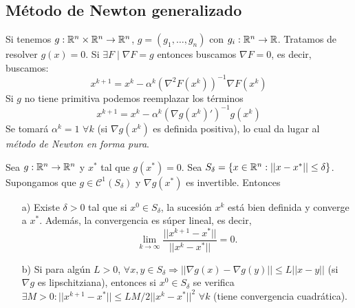\documentclass[MIOP.tex]{subfiles}
\begin{document}
\subsection{Método de Newton generalizado}
Si tenemos $g:\mathbb{R}^{n}\times\mathbb{R}^{ n}\to \mathbb{R}^n$, $g=(g_1,\dotsc,g_n)$ con $g_i : \mathbb{R}^n \to \mathbb{R}$. Tratamos de resolver $g(x)=0$. Si $\exists F\mid \nabla F = g$ entonces buscamos $\nabla F =0$, es decir, buscamos:
\[
x^{k+1} =x^k - \alpha^k (\nabla^2 F(x^k))^{-1}\nabla F(x^k)
\]
Si $g$ no tiene primitiva podemos reemplazar los términos 
\[
x^{k+1}=x^k-\alpha^k(\nabla g(x^k)')^{-1} g(x^k)
\]
Se tomará $\alpha^k =1$ $\forall k$ (si $\nabla g(x^k)$ es definida positiva), lo cual da lugar al \emph{método de Newton en forma pura}.

\begin{teorema}
Sea $g:\mathbb{R}^n\to\mathbb{R}^n$ y $x^*$ tal que $g(x^*)=0$. Sea $S_\delta=\{x\in\mathbb{R}^n:||x-x^*||\leq\delta\}$. Supongamos que $g\in\mathcal{C}^1(S_\delta)$ y $\nabla g(x^*)$ es invertible. Entonces
\begin{itemize}
\item[a)] Existe $\delta>0$ tal que si $x^0\in S_\delta$, la sucesión $x^k$ está bien definida y converge a $x^*$. Además, la convergencia es súper lineal, es decir,
$$\lim_{k\to\infty}\frac{||x^{k+1}-x^*||}{||x^k-x^*||}=0.$$
\item[b)] Si para algún $L>0$, $\forall x,y\in S_\delta\Rightarrow ||\nabla g(x)-\nabla g(y)||\leq L||x-y||$ (si $\nabla g$ es lipschitziana), entonces si $x^0\in S_\delta$ se verifica $\exists M>0:||x^{k+1}-x^*||\leq LM/2||x^k-x^*||^2$ $\forall k$ (tiene convergencia cuadrática).
\end{itemize}
\end{teorema}
\end{document}
